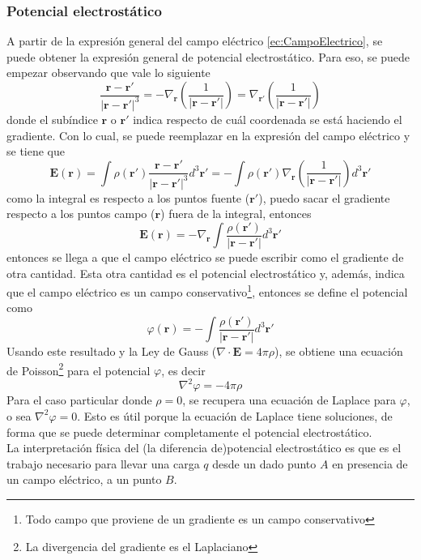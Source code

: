 \subsubsection{Potencial electrostático}
A partir de la expresión general del campo eléctrico \eqref{ec:CampoElectrico}, se puede obtener la expresión general de potencial electrostático. Para eso, se puede empezar observando que vale lo siguiente
\begin{equation}
    \frac{\textbf{r}-\textbf{r}'}{|\textbf{r}-\textbf{r}'|^{3}}
    = -\nabla_{\textbf{r}}
    \left(
        \frac{1}{|\textbf{r}-\textbf{r}'|}
    \right)
    = \nabla_{\textbf{r}'}
    \left(
        \frac{1}{|\textbf{r}-\textbf{r}'|}
    \right)
        \label{ec:IdentidadPotencialCampo}
\end{equation}
donde el subíndice $\textbf{r}$ o $\textbf{r}'$ indica respecto de cuál coordenada se está haciendo el gradiente. Con lo cual, se puede reemplazar en la expresión del campo eléctrico y se tiene que
\begin{equation*}
    \textbf{E}(\textbf{r}) =
    \int \rho(\textbf{r}')
    \frac{\textbf{r}-\textbf{r}'}{|\textbf{r}-\textbf{r}'|^{3}}
    d^{3}\textbf{r}'
    = 
    -\int \rho(\textbf{r}')
    \nabla_{\textbf{r}}
    \left(
        \frac{1}{|\textbf{r}-\textbf{r}'|}
    \right)
    d^{3}\textbf{r}'
\end{equation*}
como la integral es respecto a los puntos fuente ($\textbf{r}'$), puedo sacar el gradiente respecto a los puntos campo ($\textbf{r}$) fuera de la integral, entonces
\begin{equation*}
    \textbf{E}(\textbf{r}) =
    -\nabla_{\textbf{r}}
    \int \frac{\rho(\textbf{r}')}{|\textbf{r}-\textbf{r}'|}
    d^{3}\textbf{r}'
\end{equation*}
entonces se llega a que el campo eléctrico se puede escribir como el gradiente de otra cantidad. Esta otra cantidad es el potencial electrostático y, además, indica que el campo eléctrico es un campo conservativo\footnote{Todo campo que proviene de un gradiente es un campo conservativo}, entonces se define el potencial como
\begin{equation}
    \varphi(\textbf{r}) = 
    -\int \frac{\rho(\textbf{r}')}{|\textbf{r}-\textbf{r}'|}
    d^{3}\textbf{r}'
        \label{ec:PotencialElectrostatico}
\end{equation}
Usando este resultado y la Ley de Gauss ($\nabla\cdot\textbf{E} = 4\pi \rho$), se obtiene una ecuación de Poisson\footnote{La divergencia del gradiente es el Laplaciano} para el potencial $\varphi$, es decir
\begin{equation}
    \nabla^{2}\varphi = -4\pi\rho
        \label{ec:Poisson}
\end{equation}
Para el caso particular donde $\rho = 0$, se recupera una ecuación de Laplace para $\varphi$, o sea $\nabla^{2}\varphi = 0$. Esto es útil porque la ecuación de Laplace tiene soluciones, de forma que se puede determinar completamente el potencial electrostático.\\
\indent La interpretación física del (la diferencia de)potencial electrostático es que es el trabajo necesario para llevar una carga $q$ desde un dado punto $A$ en presencia de un campo eléctrico, a un punto $B$.


